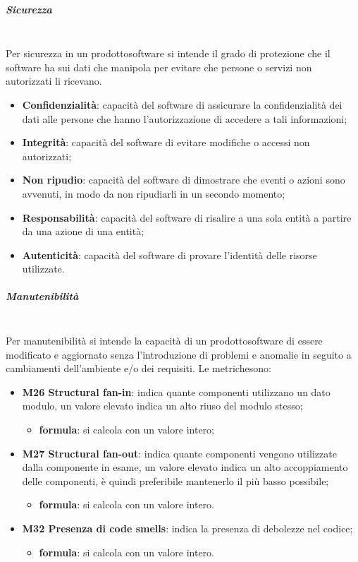 		\subparagraph{Sicurezza} \mbox{}\\
		Per sicurezza in un prodotto\glosp software si intende il grado di protezione che il software ha sui dati che manipola per evitare che persone o servizi non autorizzati li ricevano.
		\begin{itemize}
			\item \textbf{Confidenzialità}: capacità del software di assicurare la confidenzialità dei dati alle persone che hanno l'autorizzazione di accedere a tali informazioni;
			\item \textbf{Integrità}: capacità del software di evitare modifiche o accessi non autorizzati;
			\item \textbf{Non ripudio}: capacità del software di dimostrare che eventi o azioni sono avvenuti, in modo da non ripudiarli in un secondo momento;
			\item \textbf{Responsabilità}: capacità del software di risalire a una sola entità a partire da una azione di una entità;
			\item \textbf{Autenticità}: capacità del software di provare l'identità delle risorse utilizzate.
		\end{itemize}
	
		\subparagraph{Manutenibilità} \mbox{}\\[1mm]
		Per manutenibilità si intende la capacità di un prodotto\glosp software di essere modificato e aggiornato senza l'introduzione di problemi e anomalie in seguito a cambiamenti dell'ambiente e/o dei requisiti.
		Le metriche\glosp sono:
		\begin{itemize}
			\item \textbf{M26 Structural fan-in}: indica quante componenti utilizzano un dato modulo, un valore elevato indica un alto riuso del modulo stesso;
			\begin{itemize}
				\item[] \textbf{formula}: si calcola con un valore intero;
			\end{itemize}
			\item \textbf{M27 Structural fan-out}: indica quante componenti vengono utilizzate dalla componente in esame, un valore elevato indica un alto accoppiamento delle componenti, è quindi preferibile mantenerlo il più basso possibile;
			\begin{itemize}
				\item[] \textbf{formula}: si calcola con un valore intero.
			\end{itemize}		
			\item \textbf{M32 Presenza di code smells}: indica la presenza di debolezze nel codice;
			\begin{itemize}
				\item[] \textbf{formula}: si calcola con un valore intero.
			\end{itemize}
		\end{itemize}
